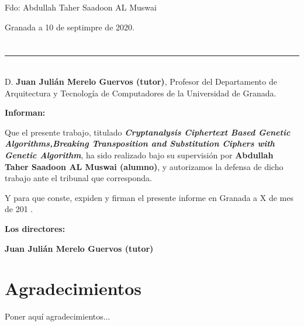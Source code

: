 \vspace{6cm}

\noindent Fdo: Abdullah Taher Saadoon AL Muswai

\vspace{2cm}

\begin{flushright}
Granada a 10 de septimpre de 2020.
\end{flushright}


\chapter*{}
\thispagestyle{empty}

\noindent\rule[-1ex]{\textwidth}{2pt}\\[4.5ex]

D. \textbf{ Juan Julián Merelo Guervos (tutor)}, Profesor del Departamento de Arquitectura y Tecnología de Computadores de la Universidad de Granada.

\vspace{0.5cm}



\vspace{0.5cm}

\textbf{Informan:}

\vspace{0.5cm}

Que el presente trabajo, titulado \textit{\textbf{Cryptanalysis Ciphertext Based Genetic Algorithms,Breaking Transposition and Substitution Ciphers with Genetic Algorithm}},
ha sido realizado bajo su supervisión por \textbf{Abdullah Taher Saadoon AL Muswai (alumno)}, y autorizamos la defensa de dicho trabajo ante el tribunal
que corresponda.

\vspace{0.5cm}

Y para que conste, expiden y firman el presente informe en Granada a X de mes de 201 .

\vspace{1cm}

\textbf{Los directores:}

\vspace{5cm}

\noindent \textbf{Juan Julián Merelo Guervos (tutor) \ \ }

\chapter*{Agradecimientos}
\thispagestyle{empty}

       \vspace{1cm}


Poner aquí agradecimientos...


